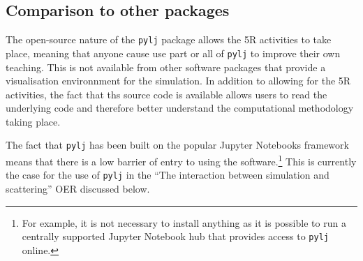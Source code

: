 \subsection{Comparison to other packages}
The open-source nature of the \texttt{pylj} package allows the 5R activities to take place, meaning that anyone cause use part or all of \texttt{pylj} to improve their own teaching.
This is not available from other software packages that provide a visualisation environnment for the simulation.
In addition to allowing for the 5R activities, the fact that ths source code is available allows users to read the underlying code and therefore better understand the computational methodology taking place.

The fact that \texttt{pylj} has been built on the popular Jupyter Notebooks framework means that there is a low barrier of entry to using the software.\footnote{For example, it is not necessary to install anything as it is possible to run a centrally supported Jupyter Notebook hub that provides access to \texttt{pylj} online.}
This is currently the case for the use of \texttt{pylj} in the ``The interaction between simulation and scattering'' OER discussed below.
